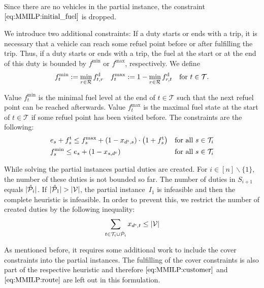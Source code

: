 Since there are no vehicles in the partial instance, the constraint $\eqref{eq:MMILP:initial_fuel}$ is dropped.

We introduce two additional constraints: If a duty starts or ends with a trip, it is necessary that a vehicle can reach some refuel point before or after fulfilling the trip. Thus, if a duty starts or ends with a trip, the fuel at the start or at the end of this duty is bounded by $f^{\min}$ or $f^{\max}$, respectively. We define  
\begin{align*}
	f^{\min}_t := \min_{r\in\mathcal{R}}f^{\operatorname{d}}_{t,r} && f^{\max}_t := 1 - \min_{r\in\mathcal{R}}f^{\operatorname{d}}_{r,t} && \text{for } t\in\mathcal{T}.
\end{align*}

Value $f^{\min}_t$ is the minimal fuel level at the end of ${t\in\mathcal{T}}$ such that the next refuel point can be reached afterwards. Value $f^{\max}_t$ is the maximal fuel state at the start of ${t\in\mathcal{T}}$ if some refuel point has been visited before. The constraints are the following:
\begin{align}
	& e_s + f^{\operatorname{t}}_s \leq f^{\max}_s + \left(1-x_{d^{\operatorname{s}},s}\right)\cdot\left(1+f^{\operatorname{t}}_s\right) && \text{for all } s\in\mathcal{T}_i \label{eq:CMILP:fmax} \\
	& f^{\min}_s \leq e_s + \left(1-x_{s,d^{\operatorname{e}}}\right) && \text{for all } s\in\mathcal{T}_i \label{eq:CMILP:fmin}
\end{align}

While solving the partial instances partial duties are created. For ${i\in[n]\backslash\{1\}}$, the number of these duties is not bounded so far. The number of duties in $S_{i+1}$ equals $\vert\hat{\mathcal{P}}_i\vert$. If ${\vert\hat{\mathcal{P}}_1\vert > \vert\mathcal{V}\vert}$, the partial instance~$I_1$ is infeasible and then the complete heuristic is infeasible. In order to prevent this, we restrict the number of created duties by the following inequality:
\begin{align}
	\sum_{t\in\mathcal{T}_i\cup\hat{\mathcal{P}}_i} x_{d^{\operatorname{s}},t} \leq \vert\mathcal{V}\vert \label{eq:CMILP:strengthening}
\end{align}

As mentioned before, it requires some additional work to include the cover constraints into the partial instances. The fulfilling of the cover constraints is also part of the respective heuristic and therefore $\eqref{eq:MMILP:customer}$ and $\eqref{eq:MMILP:route}$ are left out in this formulation.

